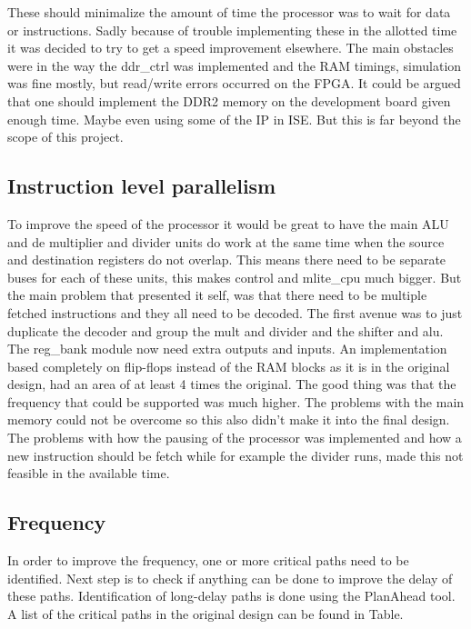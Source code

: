 \documentclass[final]{article}
\begin{document}
These should minimalize the amount of time the processor was to wait for data or instructions.
Sadly because of trouble implementing these in the allotted time it was decided to try to get a speed improvement elsewhere.
The main obstacles were in the way the ddr\_ctrl was implemented and the RAM timings, simulation was fine mostly, but read/write errors occurred on the FPGA.
It could be argued that one should implement the DDR2 memory on the development board given enough time.
Maybe even using some of the IP in ISE.
But this is far beyond the scope of this project.

\subsection{Instruction level parallelism}
To improve the speed of the processor it would be great to have the main ALU and de multiplier and divider units do work at the same time when the source and destination registers do not overlap.
This means there need to be separate buses for each of these units, this makes control and mlite\_cpu much bigger.
But the main problem that presented it self, was that there need to be multiple fetched instructions and they all need to be decoded.
The first avenue was to just duplicate the decoder and group the mult and divider and the shifter and alu.
The reg\_bank module now need extra outputs and inputs.
An implementation based completely on flip-flops instead of the RAM blocks as it is in the original design, had an area of at least 4 times the original.
The good thing was that the frequency that could be supported was much higher.
The problems with the main memory could not be overcome so this also didn't make it into the final design.
The problems with how the pausing of the processor was implemented and how a new instruction should be fetch while for example the divider runs, made this not feasible in the available time.

\subsection{Frequency}
In order to improve the frequency, one or more critical paths need to be identified. Next step is to check if anything can be done to improve the delay of these paths. Identification of long-delay paths is done using the PlanAhead tool. A list of the critical paths in the original design can be found in Table.
\end{document}
